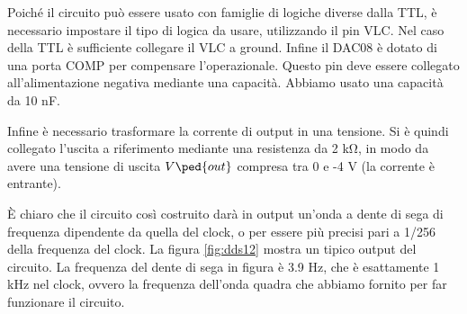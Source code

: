 Poiché il circuito può essere usato con famiglie di logiche diverse dalla TTL, è necessario impostare
il tipo di logica da usare, utilizzando il pin VLC. Nel caso della TTL è sufficiente collegare il VLC a ground.
Infine il DAC08 è dotato di una porta COMP per compensare l'operazionale. Questo pin deve
essere collegato all'alimentazione negativa mediante una capacità. Abbiamo usato una capacità da 10 nF.

Infine è necessario trasformare la corrente di output in una tensione. Si è quindi collegato l'uscita a
riferimento mediante una resistenza da 2 \si{\kilo\ohm}, in modo da avere una tensione di uscita $V\ped{out}$
compresa tra 0 e -4 V (la corrente è entrante).

È chiaro che il circuito così costruito darà in output un'onda a dente di sega di frequenza dipendente da quella del clock,
o per essere più precisi pari a 1/256 della frequenza del clock. La figura \ref{fig:dds12} mostra un tipico output del circuito.
La frequenza del dente di sega in figura è 3.9 Hz, che è esattamente 1 kHz nel clock, ovvero la frequenza dell'onda quadra che abbiamo
fornito per far funzionare il circuito.
